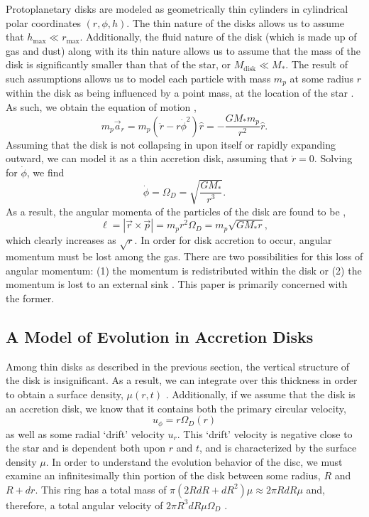 \documentclass[aps,pra,twocolumn]{revtex4-1}
\begin{document}
Protoplanetary disks are modeled as geometrically thin cylinders in cylindrical polar coordinates $(r, \phi, h)$.  The thin nature of the disks allows us to assume that $h_{\text{max}} \ll r_{\text{max}}$.  Additionally, the fluid nature of the disk (which is made up of gas and dust) along with its thin nature allows us to assume that the mass of the disk is significantly smaller than that of the star, or $M_{\text{disk}} \ll M_{*}$.  The result of such assumptions allows us to model each particle with mass $m_p$ at some radius $r$ within the disk as being influenced by a point mass,  at the location of the star \cite{armitage2011}.  As such, we obtain the equation of motion \cite{taylor2005},
\begin{equation}
m_p \vec{a}_r = m_p ( \ddot{r} - r\dot{\phi}^2 )\hat{r} = - \frac{G M_* m_p}{r^2}\hat{r} . \nonumber
\end{equation}
Assuming that the disk is not collapsing in upon itself or rapidly expanding outward, we can model it as a thin accretion disk, assuming that $\ddot{r} = 0$.  Solving for $\dot{\phi}$, we find \cite{armitage2011}
\begin{equation}
\dot{\phi} = \Omega_D = \sqrt{\frac{G M_*}{r^3}}.
\end{equation}
As a result, the angular momenta of the particles of the disk are found to be \cite{taylor2005},
\begin{equation}
\ell = \left| \vec{r} \times \vec{p} \right| = m_p r^2 \Omega_D = m_p \sqrt{G M_* r},
\end{equation}
which clearly increases as $\sqrt{r}$.  In order for disk accretion to occur, angular momentum must be lost among the gas.  There are two possibilities for this loss of angular momentum: (1) the momentum is redistributed within the disk or (2) the momentum is lost to an external sink \cite{armitage2011}.  This paper is primarily concerned with the former.


\subsection{\label{section2.1} A Model of Evolution in Accretion Disks }
Among thin disks as described in the previous section, the vertical structure of the disk is insignificant.  As a result, we can integrate over this thickness in order to obtain a surface density, $\mu(r, t)$  \cite{armitage2011}.  Additionally, if we assume that the disk is an accretion disk, we know that it contains both the primary circular velocity,
\begin{equation}
u_\phi = r\Omega_D(r)
\end{equation}
as well as some radial `drift' velocity $u_r$.  This `drift' velocity is negative close to the star and is dependent both upon $r$ and $t$, and is characterized by the surface density $\mu$.  In order to understand the evolution behavior of the disc, we must examine an infinitesimally thin portion of the disk between some radius, $R$ and $R + dr$.  This ring has a total mass of $\pi \left(2 R dR + dR^2 \right)\mu \approx 2 \pi R dR \mu$ and, therefore, a total angular velocity of $2\pi R^3 dR \mu \Omega_D$ \cite{king2002}.
\end{document}
